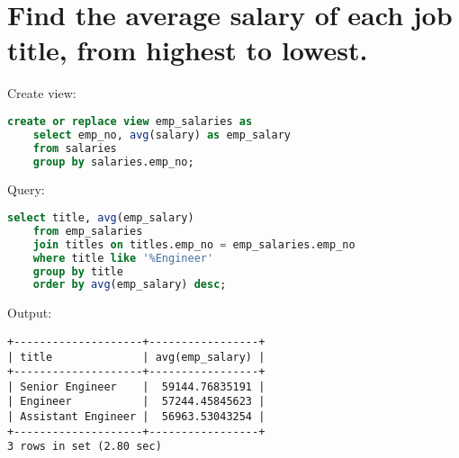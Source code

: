 \documentclass[12pt]{article}
\begin{document}

\section{Find the average salary of each job title, from highest to lowest.}

Create view:
\begin{lstlisting}[language=SQL]
create or replace view emp_salaries as
    select emp_no, avg(salary) as emp_salary
    from salaries
    group by salaries.emp_no;
\end{lstlisting}

Query:

\begin{lstlisting}[language=SQL]
select title, avg(emp_salary)
    from emp_salaries
    join titles on titles.emp_no = emp_salaries.emp_no
    where title like '%Engineer'
    group by title
    order by avg(emp_salary) desc;
\end{lstlisting}

Output:

\begin{verbatim}
+--------------------+-----------------+
| title              | avg(emp_salary) |
+--------------------+-----------------+
| Senior Engineer    |  59144.76835191 |
| Engineer           |  57244.45845623 |
| Assistant Engineer |  56963.53043254 |
+--------------------+-----------------+
3 rows in set (2.80 sec)
\end{verbatim}

\end{document}
